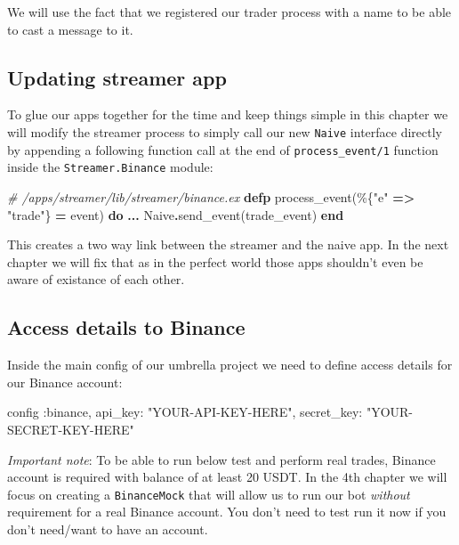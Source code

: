 \documentclass[
  oneside]{book}
\newenvironment{Shaded}{\begin{snugshade}}{\end{snugshade}}
\newcommand{\CommentTok}[1]{\textcolor[rgb]{0.56,0.35,0.01}{\textit{#1}}}
\newcommand{\ConstantTok}[1]{\textcolor[rgb]{0.00,0.00,0.00}{#1}}
\newcommand{\KeywordTok}[1]{\textcolor[rgb]{0.13,0.29,0.53}{\textbf{#1}}}
\newcommand{\NormalTok}[1]{#1}
\newcommand{\OperatorTok}[1]{\textcolor[rgb]{0.81,0.36,0.00}{\textbf{#1}}}
\newcommand{\StringTok}[1]{\textcolor[rgb]{0.31,0.60,0.02}{#1}}
\newcommand{\VariableTok}[1]{\textcolor[rgb]{0.00,0.00,0.00}{#1}}
\begin{document}
We will use the fact that we registered our trader process with a name to be able to cast a message to it.

\hypertarget{updating-streamer-app}{%
\subsection{Updating streamer app}\label{updating-streamer-app}}

To glue our apps together for the time and keep things simple in this chapter we will modify the streamer process to simply call our new \texttt{Naive} interface directly by appending a following function call at the end of \texttt{process\_event/1} function inside the \texttt{Streamer.Binance} module:

\begin{Shaded}
\begin{Highlighting}[]
  \CommentTok{\# /apps/streamer/lib/streamer/binance.ex}
  \KeywordTok{defp}\NormalTok{ process\_event(\%\{}\StringTok{"e"} \OperatorTok{=\textgreater{}} \StringTok{"trade"}\NormalTok{\} }\OperatorTok{=}\NormalTok{ event) }\KeywordTok{do}
    \OperatorTok{...}
    \ConstantTok{Naive}\OperatorTok{.}\NormalTok{send\_event(trade\_event)}
  \KeywordTok{end}
\end{Highlighting}
\end{Shaded}

This creates a two way link between the streamer and the naive app. In the next chapter we will fix that as in the perfect world those apps shouldn't even be aware of existance of each other.

\hypertarget{access-details-to-binance}{%
\subsection{Access details to Binance}\label{access-details-to-binance}}

Inside the main config of our umbrella project we need to define access details for our Binance account:

\begin{Shaded}
\begin{Highlighting}[]
\NormalTok{config }\VariableTok{:binance}\NormalTok{,}
  \VariableTok{api\_key:} \StringTok{"YOUR{-}API{-}KEY{-}HERE"}\NormalTok{,}
  \VariableTok{secret\_key:} \StringTok{"YOUR{-}SECRET{-}KEY{-}HERE"}
\end{Highlighting}
\end{Shaded}

\emph{Important note}: To be able to run below test and perform real trades, Binance account is required with balance of at least 20 USDT. In the 4th chapter we will focus on creating a \texttt{BinanceMock} that will allow us to run our bot \emph{without} requirement for a real Binance account. You don't need to test run it now if you don't need/want to have an account.
\end{document}
